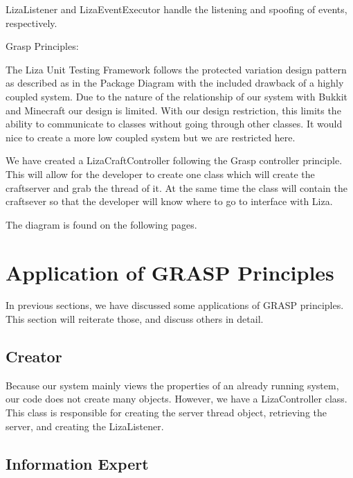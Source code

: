\documentclass{article}
\begin{document}
\noindent
LizaListener and LizaEventExecutor handle the listening and spoofing of
events, respectively. 
\newline

\noindent
Grasp Principles:
\newline

\noindent
The Liza Unit Testing Framework follows the protected variation design pattern as
described as in the Package Diagram with the included drawback of a highly coupled system.
Due to the nature of the relationship of our system with Bukkit and Minecraft our design is limited.
With our design restriction, this limits the ability to communicate to classes without going through
other classes.  It would nice to create a more low coupled system but we are restricted here. \newline 

\noindent
We have created a LizaCraftController following the Grasp controller principle.  This will allow for the developer 
to create one class which will create the craftserver and grab the thread of it.  At the same time the class will
contain the craftsever so that the developer will know where to go to interface with Liza.
\newline



The diagram is found on the following pages.
\newline

\newpage


\newpage
\section{Application of GRASP Principles}

In previous sections, we have discussed some applications of GRASP principles. 
This section will reiterate those, and discuss others in detail.

	\subsection{Creator}

	Because our system mainly views the properties of an already running system,
	our code does not create many objects. However, we have a LizaController class.
	This class is responsible for creating the server thread object, retrieving the
	server, and creating the LizaListener.

	\subsection{Information Expert}
\end{document}
